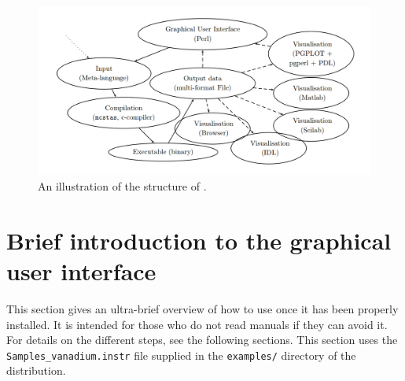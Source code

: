 \begin{figure}[htb!]
\begin{center}
    \includegraphics[width=\textwidth]{figures/mcstas_software_png.png}
\end{center}
\caption{An illustration of the structure of \MCS .}
\label{fig:structure}
\end{figure}

\section{Brief introduction to the graphical user interface}
\label{s:brief}

This section gives an ultra-brief overview of how to use \MCS once it
has been properly installed. It is intended for those who do not read
manuals if they can avoid it. For details on the different steps, see
the following sections. This section uses the
\verb+Samples_vanadium.instr+ file supplied in the \verb+examples/+
directory of the \MCS distribution. %

